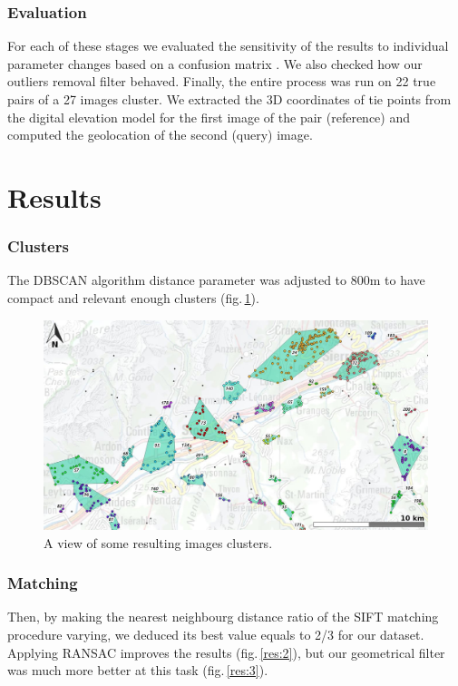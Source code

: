 \documentclass[fleqn,10pt,lineno]{wlpeerj} %
\begin{document}
\subsubsection*{Evaluation}
For each of these stages we evaluated the sensitivity of the results to individual
parameter changes based on a confusion matrix \citep{stehman1997}.
We also checked how our outliers removal filter behaved.
Finally, the entire process was run on 22 true pairs of a 27 images cluster. 
We extracted the 3D coordinates of tie points from the digital elevation model
for the first image of the pair (reference) and computed the geolocation of 
the second (query) image.



\section*{Results}
\subsubsection*{Clusters}
The DBSCAN algorithm distance parameter was adjusted to 800m to have compact and
relevant enough clusters (fig.\,\ref{clusters}).

\begin{figure}[H]
\centering
\includegraphics[width=0.8\linewidth]{clusters2.jpg}
\caption{A view of some resulting images clusters.}
\label{clusters}
\end{figure}


\subsubsection*{Matching}
Then, by making the nearest neighbourg distance ratio of the SIFT matching 
procedure varying, we deduced its best value equals to 2/3 for our dataset.
Applying RANSAC improves the results (fig.\,\ref{res:2}), but our geometrical 
filter was much more better at this task (fig.\,\ref{res:3}).
\end{document}
